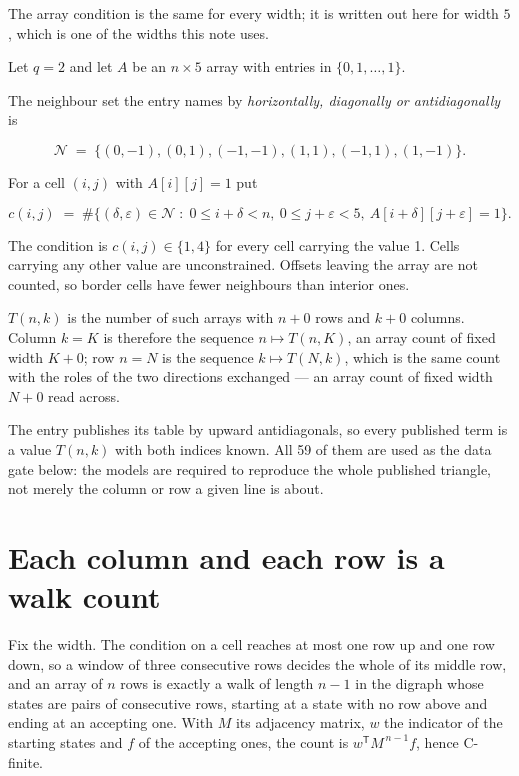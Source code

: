 \documentclass[11pt]{article}
\theoremstyle{definition}
\begin{document}
The array condition is the same for every width; it is written out here for width $5$, which is one of the widths this note uses.

Let $q = 2$ and let $A$ be an $n \times 5$ array with entries in $\{0,1,\dots,1\}$.

The neighbour set the entry names by {\itshape horizontally, diagonally or antidiagonally} is

\[\mathcal{N} \;=\; \{(0,-1), (0,1), (-1,-1), (1,1), (-1,1), (1,-1)\}.\]

For a cell $(i,j)$ with $A[i][j] = 1$ put

\[c(i,j) \;=\; \#\bigl\{(\delta,\varepsilon)\in\mathcal{N} \;:\; 0\le i+\delta<n,\ 0\le j+\varepsilon<5,\ A[i+\delta][j+\varepsilon] = 1\bigr\}.\]

The condition is $c(i,j) \in \{1, 4\}$ for every cell carrying the value 1. Cells carrying any other value are unconstrained. Offsets leaving the array are not counted, so border cells have fewer neighbours than interior ones.

$T(n,k)$ is the number of such arrays with $n + 0$ rows and $k + 0$ columns. Column $k = K$ is therefore the sequence $n \mapsto T(n,K)$, an array count of fixed width $K + 0$; row $n = N$ is the sequence $k \mapsto T(N,k)$, which is the same count with the roles of the two directions exchanged --- an array count of fixed width $N + 0$ read across.

The entry publishes its table by upward antidiagonals, so every published term is a value $T(n,k)$ with both indices known. All 59 of them are used as the data gate below: the models are required to reproduce the whole published triangle, not merely the column or row a given line is about.

\section{Each column and each row is a walk count}

Fix the width. The condition on a cell reaches at most one row up and one row down, so a window of three consecutive rows decides the whole of its middle row, and an array of $n$ rows is exactly a walk of length $n-1$ in the digraph whose states are pairs of consecutive rows, starting at a state with no row above and ending at an accepting one. With $M$ its adjacency matrix, $w$ the indicator of the starting states and $f$ of the accepting ones, the count is $w^{\mathsf T}M^{\,n-1}f$, hence C-finite.
\end{document}
